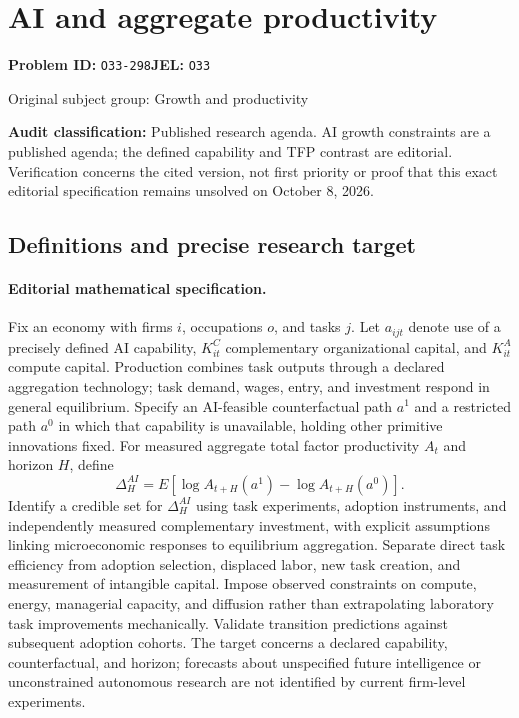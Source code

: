 \documentclass[11pt,a4paper]{article}
\begin{document}
\section*{AI and aggregate productivity}
\textbf{Problem ID:} \texttt{O33-298}\quad \textbf{JEL:} \texttt{O33}\par
\label{problem:OP-0263}
{\sffamily\small\color{muted}Original subject group: Growth and productivity\par}
\label{definitions:problem:30007544}
\textbf{Audit classification:} Published research agenda. AI growth constraints are a published agenda; the defined capability and TFP contrast are editorial. Verification concerns the cited version, not first priority or proof that this exact editorial specification remains unsolved on October 8, 2026.
\subsection*{Definitions and precise research target}
\paragraph{Editorial mathematical specification.} Fix an economy with firms \(i\), occupations \(o\), and tasks \(j\). Let \(a_{ijt}\) denote use of a precisely defined AI capability, \(K^C_{it}\) complementary organizational capital, and \(K^A_{it}\) compute capital. Production combines task outputs through a declared aggregation technology; task demand, wages, entry, and investment respond in general equilibrium. Specify an AI-feasible counterfactual path \(a^1\) and a restricted path \(a^0\) in which that capability is unavailable, holding other primitive innovations fixed.
For measured aggregate total factor productivity \(A_t\) and horizon \(H\), define
\[
\Delta_H^{AI}=E[\log A_{t+H}(a^1)-\log A_{t+H}(a^0)].
\]
Identify a credible set for \(\Delta_H^{AI}\) using task experiments, adoption instruments, and independently measured complementary investment, with explicit assumptions linking microeconomic responses to equilibrium aggregation. Separate direct task efficiency from adoption selection, displaced labor, new task creation, and measurement of intangible capital. Impose observed constraints on compute, energy, managerial capacity, and diffusion rather than extrapolating laboratory task improvements mechanically. Validate transition predictions against subsequent adoption cohorts. The target concerns a declared capability, counterfactual, and horizon; forecasts about unspecified future intelligence or unconstrained autonomous research are not identified by current firm-level experiments.
\end{document}

